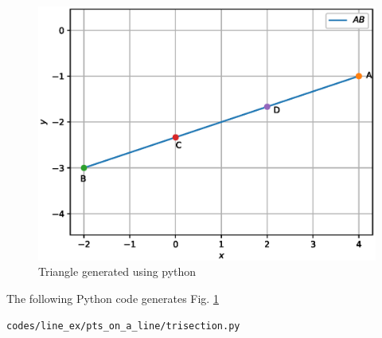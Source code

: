\begin{enumerate}
\begin{figure}[!ht]
\centering
\includegraphics[width=\columnwidth]{./figs/line_ex/pts_on_a_line/trisection.eps}
\caption{Triangle generated using python}
\label{fig:trisection_pts_on_a_line}
\end{figure} 

\solution The  following Python code generates Fig. \ref{fig:trisection_pts_on_a_line}

\begin{lstlisting}
codes/line_ex/pts_on_a_line/trisection.py
\end{lstlisting}

\end{enumerate}


